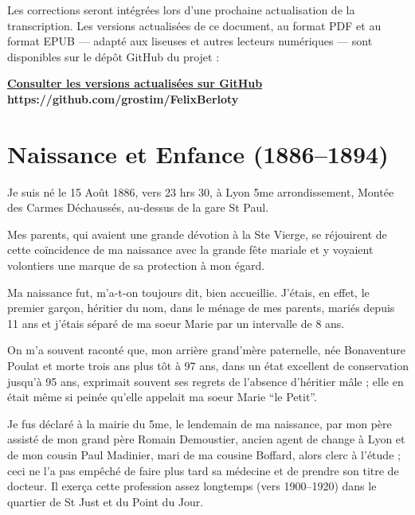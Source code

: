 \documentclass[11pt,a4paper]{report}
\begin{document}
Les corrections seront intégrées lors d'une prochaine actualisation de la transcription. 
Les versions actualisées de ce document, au format PDF et au format EPUB --- adapté aux liseuses et autres lecteurs numériques --- sont disponibles sur le dépôt GitHub du projet :

\begin{center}
    \href{https://github.com/grostim/FelixBerloty/releases/latest}{\textbf{Consulter les versions actualisées sur GitHub}}
    \textbf{https://github.com/grostim/FelixBerloty}
\end{center}

\newpage
\pagestyle{fancy}

\chapter{Naissance et Enfance (1886--1894)}

Je suis né le 15 Août 1886, vers 23 hrs 30, à Lyon 5me arrondissement, Montée des Carmes Déchaussés, au-dessus de la gare St Paul.

Mes parents, qui avaient une grande dévotion à la Ste Vierge, se réjouirent de cette coïncidence de ma naissance avec la grande fête mariale et y voyaient volontiers une marque de sa protection à mon égard.

Ma naissance fut, m'a-t-on toujours dit, bien accueillie. J'étais, en effet, le premier garçon, héritier du nom, dans le ménage de mes parents, mariés depuis 11 ans et j'étais séparé de ma soeur Marie par un intervalle de 8 ans.

On m'a souvent raconté que, mon arrière grand'mère paternelle, née Bonaventure Poulat et morte trois ans plus tôt à 97 ans, dans un état excellent de conservation jusqu'à 95 ans, exprimait souvent ses regrets de l'absence d'héritier mâle ; elle en était même si peinée qu'elle appelait ma soeur Marie ``le Petit''.

Je fus déclaré à la mairie du 5me, le lendemain de ma naissance, par mon père assisté de mon grand père Romain Demoustier, ancien agent de change à Lyon et de mon cousin Paul Madinier, mari de ma cousine Boffard, alors clerc à l'étude ; ceci ne l'a pas empêché de faire plus tard sa médecine et de prendre son titre de docteur. Il exerça cette profession assez longtemps (vers 1900--1920) dans le quartier de St Just et du Point du Jour.
\end{document}
